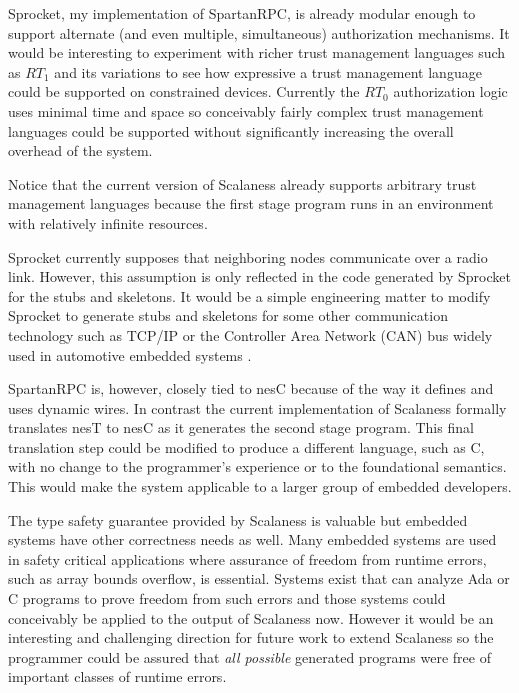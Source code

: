 Sprocket, my implementation of SpartanRPC, is already modular enough to support alternate (and
even multiple, simultaneous) authorization mechanisms. It would be interesting to experiment
with richer trust management languages such as $RT_1$ and its variations to see how expressive a
trust management language could be supported on constrained devices. Currently the $RT_0$
authorization logic uses minimal time and space so conceivably fairly complex trust management
languages could be supported without significantly increasing the overall overhead of the
system.

Notice that the current version of Scalaness already supports arbitrary trust management
languages because the first stage program runs in an environment with relatively infinite
resources.

Sprocket currently supposes that neighboring nodes communicate over a radio link. However, this
assumption is only reflected in the code generated by Sprocket for the stubs and skeletons. It
would be a simple engineering matter to modify Sprocket to generate stubs and skeletons for some
other communication technology such as TCP/IP or the Controller Area Network (CAN) bus widely
used in automotive embedded systems \cite{pazul1999controller}.

SpartanRPC is, however, closely tied to nesC because of the way it defines and uses dynamic
wires. In contrast the current implementation of Scalaness formally translates nesT to nesC as
it generates the second stage program. This final translation step could be modified to produce
a different language, such as C, with no change to the programmer's experience or to the
foundational semantics. This would make the system applicable to a larger group of embedded
developers.

The type safety guarantee provided by Scalaness is valuable but embedded systems have other
correctness needs as well. Many embedded systems are used in safety critical applications where
assurance of freedom from runtime errors, such as array bounds overflow, is essential. Systems
exist that can analyze Ada or C programs to prove freedom from such errors
\cite{Barnes:2000:SWC:369264.369271,Cuoq:2012:FSA:2404232.2404250} and those systems could
conceivably be applied to the output of Scalaness now. However it would be an interesting and
challenging direction for future work to extend Scalaness so the programmer could be assured
that \emph{all possible} generated programs were free of important classes of runtime errors.

